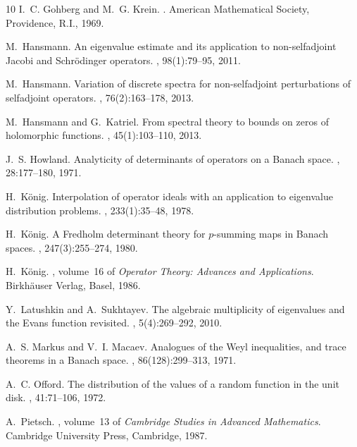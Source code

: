 \documentclass[12pt,a4paper]{article}
\theoremstyle{definition}
\theoremstyle{remark}
\numberwithin{equation}{section}
\begin{document}
\begin{thebibliography}{10}
I.~C. Gohberg and M.~G. Krein.
.
\newblock American Mathematical Society, Providence, R.I., 1969.

M.~Hansmann.
\newblock An eigenvalue estimate and its application to non-selfadjoint
  {J}acobi and {S}chr\"odinger operators.
, 98(1):79--95, 2011.

M.~Hansmann.
\newblock Variation of discrete spectra for non-selfadjoint perturbations of
  selfadjoint operators.
, 76(2):163--178, 2013.

M.~Hansmann and G.~Katriel.
\newblock From spectral theory to bounds on zeros of holomorphic functions.
, 45(1):103--110, 2013.

J.~S. Howland.
\newblock Analyticity of determinants of operators on a {B}anach space.
, 28:177--180, 1971.

H.~K{\"o}nig.
\newblock Interpolation of operator ideals with an application to eigenvalue
  distribution problems.
, 233(1):35--48, 1978.

H.~K{\"o}nig.
\newblock A {F}redholm determinant theory for {$p$}-summing maps in {B}anach
  spaces.
, 247(3):255--274, 1980.

H.~K{\"o}nig.
, volume~16 of {\em
  Operator Theory: Advances and Applications}.
\newblock Birkh\"auser Verlag, Basel, 1986.

Y.~Latushkin and A.~Sukhtayev.
\newblock The algebraic multiplicity of eigenvalues and the {E}vans function
  revisited.
, 5(4):269--292, 2010.

A.~S. Markus and V.~I. Macaev.
\newblock Analogues of the {W}eyl inequalities, and trace theorems in a
  {B}anach space.
, 86(128):299--313, 1971.

A.~C. Offord.
\newblock The distribution of the values of a random function in the unit disk.
, 41:71--106, 1972.

A.~Pietsch.
, volume~13 of {\em Cambridge
  Studies in Advanced Mathematics}.
\newblock Cambridge University Press, Cambridge, 1987.


\end{thebibliography}
\end{document}
